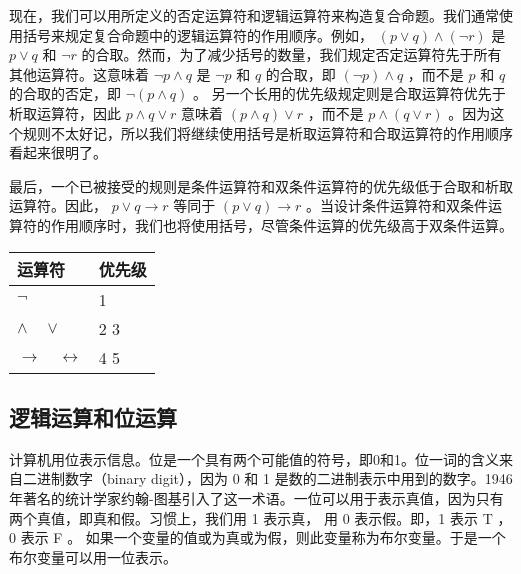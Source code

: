 现在，我们可以用所定义的否定运算符和逻辑运算符来构造复合命题。我们通常使用括号来规定复合命题中的逻辑运算符的作用顺序。例如，
$(p \lor q) \land (\neg r)$
是
$p \lor q$ 和 $\neg r$
的合取。然而，为了减少括号的数量，我们规定否定运算符先于所有其他运算符。这意味着
$\neg p \land q$
是
$\neg p$
和
$q$
的合取，即
$(\neg p) \land q$
，而不是
$p$
和
$q$
的合取的否定，即
$\neg(p \land q)$
。   
另一个长用的优先级规定则是合取运算符优先于析取运算符，因此
$p \land q \lor r$
意味着
$(p \land q) \lor r$
，而不是
$p \land (q \lor r)$
。因为这个规则不太好记，所以我们将继续使用括号是析取运算符和合取运算符的作用顺序看起来很明了。  

最后，一个已被接受的规则是条件运算符和双条件运算符的优先级低于合取和析取运算符。因此，
$p \lor q \to r$
等同于
$(p \lor q) \to r$
。当设计条件运算符和双条件运算符的作用顺序时，我们也将使用括号，尽管条件运算的优先级高于双条件运算。

\begin{table}
	\begin{tabular}{l|l}
		\hline
		运算符 & 优先级 \\
		\hline
		$\neg$	& 1 \\
		$\land \quad \lor$ & 2 3 \\
		$\to \quad \leftrightarrow$ & 4 5 \\
		\hline
	\end{tabular}
\end{table}


\subsection{逻辑运算和位运算}

计算机用位表示信息。位是一个具有两个可能值的符号，即0和1。位一词的含义来自二进制数字（binary digit），因为 0 和 1 是数的二进制表示中用到的数字。1946 年著名的统计学家约翰-图基引入了这一术语。一位可以用于表示真值，因为只有两个真值，即真和假。习惯上，我们用 1 表示真， 用 0 表示假。即，1 表示 T ， 0 表示 F 。 如果一个变量的值或为真或为假，则此变量称为布尔变量。于是一个布尔变量可以用一位表示。
